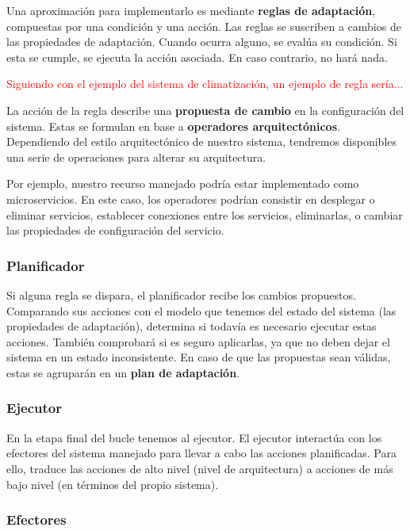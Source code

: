 Una aproximación para implementarlo es mediante \textbf{reglas de adaptación}, compuestas por una condición y una acción. Las reglas se suscriben a cambios de las propiedades de adaptación. Cuando ocurra alguno, se evalúa su condición. Si esta se cumple, se ejecuta la acción asociada. En caso contrario, no hará nada.

\textcolor{red}{Siguiendo con el ejemplo del sistema de climatización, un ejemplo de regla sería...}

La acción de la regla describe una \textbf{propuesta de cambio} en la configuración del sistema. Estas se formulan en base a \textbf{operadores arquitectónicos}. \cite{garlanIncreasingSystemDependability2003} Dependiendo del estilo arquitectónico de nuestro sistema, tendremos disponibles una serie de operaciones para alterar su arquitectura.

Por ejemplo, nuestro recurso manejado podría estar implementado como microservicios. En este caso, los operadores podrían consistir en desplegar o eliminar servicios, establecer conexiones entre los servicios, eliminarlas, o cambiar las propiedades de configuración del servicio. \cite{fonsServiciosAdaptivereadyPara2021}

\subsubsection{Planificador}

Si alguna regla se dispara, el planificador recibe los cambios propuestos. Comparando sus acciones con el modelo que tenemos del estado del sistema (las propiedades de adaptación), determina si todavía es necesario ejecutar estas acciones. También comprobará si es seguro aplicarlas, ya que no deben dejar el sistema en un estado inconsistente. En caso de que las propuestas sean válidas, estas se agruparán en un \textbf{plan de adaptación}.

\subsubsection{Ejecutor}

En la etapa final del bucle tenemos al ejecutor. El ejecutor interactúa con los efectores del sistema manejado para llevar a cabo las acciones planificadas. Para ello, traduce las acciones de alto nivel (nivel de arquitectura) a acciones de más bajo nivel (en términos del propio sistema). \cite{garlanIncreasingSystemDependability2003}

\subsubsection{Efectores}


